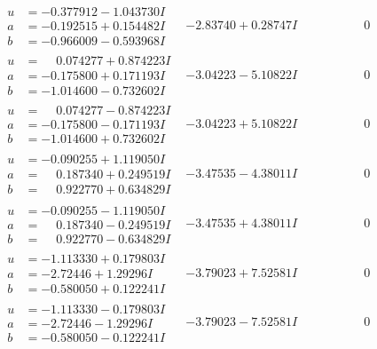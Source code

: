 \documentclass[1p]{elsarticle_modified}
\theoremstyle{definition}
\begin{document}
$$\begin{array}{c|c|c}
\begin{aligned}
u &= -0.377912 - 1.043730 I \\
a &= -0.192515 + 0.154482 I \\
b &= -0.966009 - 0.593968 I\end{aligned}
 & -2.83740 + 0.28747 I & \phantom{-0.000000 } 0 \\ \hline\begin{aligned}
u &= \phantom{-}0.074277 + 0.874223 I \\
a &= -0.175800 + 0.171193 I \\
b &= -1.014600 - 0.732602 I\end{aligned}
 & -3.04223 - 5.10822 I & \phantom{-0.000000 } 0 \\ \hline\begin{aligned}
u &= \phantom{-}0.074277 - 0.874223 I \\
a &= -0.175800 - 0.171193 I \\
b &= -1.014600 + 0.732602 I\end{aligned}
 & -3.04223 + 5.10822 I & \phantom{-0.000000 } 0 \\ \hline\begin{aligned}
u &= -0.090255 + 1.119050 I \\
a &= \phantom{-}0.187340 + 0.249519 I \\
b &= \phantom{-}0.922770 + 0.634829 I\end{aligned}
 & -3.47535 - 4.38011 I & \phantom{-0.000000 } 0 \\ \hline\begin{aligned}
u &= -0.090255 - 1.119050 I \\
a &= \phantom{-}0.187340 - 0.249519 I \\
b &= \phantom{-}0.922770 - 0.634829 I\end{aligned}
 & -3.47535 + 4.38011 I & \phantom{-0.000000 } 0 \\ \hline\begin{aligned}
u &= -1.113330 + 0.179803 I \\
a &= -2.72446 + 1.29296 I \\
b &= -0.580050 + 0.122241 I\end{aligned}
 & -3.79023 + 7.52581 I & \phantom{-0.000000 } 0 \\ \hline\begin{aligned}
u &= -1.113330 - 0.179803 I \\
a &= -2.72446 - 1.29296 I \\
b &= -0.580050 - 0.122241 I\end{aligned}
 & -3.79023 - 7.52581 I & \phantom{-0.000000 } 0 \\ \hline\begin{aligned}

\end{aligned}
\end{array}$$
\end{document}
